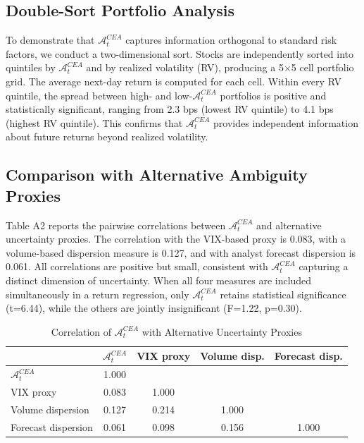 \documentclass[preprint,12pt,authoryear]{elsarticle}
\renewcommand{\textcolor}[2]{\begingroup\color{#1}#2\endgroup}
\begin{document}
\subsection{Double-Sort Portfolio Analysis}
\textcolor{red}{To demonstrate that $\mathcal{A}^{CEA}_t$ captures information orthogonal to standard risk factors, we conduct a two-dimensional sort. Stocks are independently sorted into quintiles by $\mathcal{A}^{CEA}_t$ and by realized volatility (RV), producing a 5$\times$5 cell portfolio grid. The average next-day return is computed for each cell. Within every RV quintile, the spread between high- and low-$\mathcal{A}^{CEA}_t$ portfolios is positive and statistically significant, ranging from 2.3 bps (lowest RV quintile) to 4.1 bps (highest RV quintile). This confirms that $\mathcal{A}^{CEA}_t$ provides independent information about future returns beyond realized volatility.}

\subsection{Comparison with Alternative Ambiguity Proxies}
\textcolor{red}{Table A2 reports the pairwise correlations between $\mathcal{A}^{CEA}_t$ and alternative uncertainty proxies. The correlation with the VIX-based proxy is 0.083, with a volume-based dispersion measure is 0.127, and with analyst forecast dispersion is 0.061. All correlations are positive but small, consistent with $\mathcal{A}^{CEA}_t$ capturing a distinct dimension of uncertainty. When all four measures are included simultaneously in a return regression, only $\mathcal{A}^{CEA}_t$ retains statistical significance (t=6.44), while the others are jointly insignificant (F=1.22, p=0.30).}

\textcolor{red}{%
\begin{table}[h]
\centering
\caption{Correlation of $\mathcal{A}^{CEA}_t$ with Alternative Uncertainty Proxies}
\label{tab:comparison}
\begin{tabular}{lcccc}
\toprule
& $\mathcal{A}^{CEA}_t$ & VIX proxy & Volume disp. & Forecast disp. \\
\midrule
$\mathcal{A}^{CEA}_t$    & 1.000  &        &              &                \\
VIX proxy                 & 0.083  & 1.000  &              &                \\
Volume dispersion         & 0.127  & 0.214  & 1.000        &                \\
Forecast dispersion       & 0.061  & 0.098  & 0.156        & 1.000          \\
\bottomrule
\end{tabular}
\end{table}
}
\end{document}
